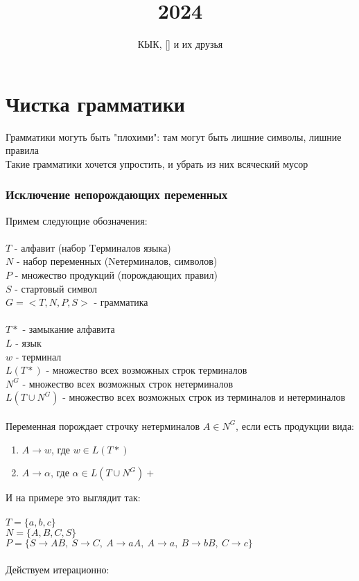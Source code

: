 \documentclass{article}
\title{2024}
\author{КЫК, [] и их друзья}
\begin{document}
\maketitle
\tableofcontents

\part{Чистка грамматики}
Грамматики могуть быть "плохими": там могут быть лишние символы, лишние правила\\
Такие грамматики хочется упростить, и убрать из них всяческий мусор

\section{Исключение непорождающих переменных}
Примем следующие обозначения:\\\\
$T$ - алфавит (набор Tерминалов языка)\\
$N$ - набор переменных (Nетерминалов, символов)\\
$P$ - множество продукций (порождающих правил)\\
$S$ - стартовый символ\\
$ G = <T, N, P, S>$ - грамматика \\\\
$T*$ - замыкание алфавита \\
$L$ - язык \\
$w$ - терминал \\
$L(T*)$ - множество всех возможных строк терминалов\\
$N^G$ - множество всех возможных строк нетерминалов\\
$L(T\cup N^G)$ - множество всех возможных строк из терминалов и нетерминалов\\
\\
Переменная порождает строчку нетерминалов $A \in N^G$, если есть продукции вида:
\begin{enumerate}
  \item $ A \to w$, где $w \in L(T*)$
  \item $ A \to \alpha$, где $\alpha \in L(T\cup N^G)+$
\end{enumerate}
И на примере это выглядит так:\\
\\
$T = \{a,b,c\}$ \\
$N = \{A,B,C,S\}$ \\
$P = \{ S \to AB,\ S \to C,\ A \to aA,\ A \to a,\ B \to bB,\ C \to c\}$
\\\\
Действуем итерационно:
\end{document}
